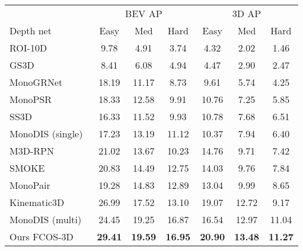 
\begin{table}[t!]
\centering
{
\footnotesize
\setlength{\tabcolsep}{0.4em}
\begin{tabular}{l|ccc|ccc}
\toprule
& \multicolumn{3}{c}{BEV AP} & \multicolumn{3}{c}{3D AP} \\ 
\multirow{-2}{*}{Depth net}& 
Easy & 
Med &
Hard &
Easy & Med & Hard \vspace{0.5mm}\\
\midrule
ROI-10D~\cite{manhardt2019roi} & 
9.78 & 
4.91 &
3.74 &
4.32 &
2.02 &
1.46
\\
GS3D~\cite{li2019gs3d} & 
8.41 & 
6.08 &
4.94 &
4.47 &
2.90 &
2.47
\\
MonoGRNet~\cite{qin2019monogrnet} & 
18.19 & 
11.17 &
8.73 &
9.61 &
5.74 &
4.25
\\
MonoPSR~\cite{ku2019monocular} & 
18.33 & 
12.58 &
9.91 &
10.76 &
7.25 &
5.85
\\

SS3D~\cite{jorgensen2019monocular} & 
16.33 & 
11.52 &
9.93 &
10.78 &
7.68 &
6.51
\\

MonoDIS (single)~\cite{simonelli2019disentangling} & 
17.23 & 
13.19 &
11.12 &
10.37 &
7.94 &
6.40
\\

M3D-RPN~\cite{brazil2019m3d} & 
21.02 & 
13.67 &
10.23 &
14.76 &
9.71 &
7.42
\\

SMOKE~\cite{liu2020smoke} & 
20.83 & 
14.49 &
12.75 &
14.03 &
9.76 &
7.84
\\

MonoPair~\cite{chen2020monopair} & 
19.28 & 
14.83 &
12.89 &
13.04 &
9.99 &
8.65
\\



Kinematic3D~\cite{brazil2020kinematic} & 
26.99 & 
17.52 &
13.10 &
19.07 &
12.72 &
9.17
\\

MonoDIS (multi)~\cite{simonelli2020disentangling} & 
24.45 & 
19.25 &
16.87 &
16.54 &
12.97 &
11.04
\\




Ours FCOS-3D & 
\textbf{29.41} & 
\textbf{19.59} &
\textbf{16.95} &
\textbf{20.90} &
\textbf{13.48} &
\textbf{11.27}
\\





\end{tabular}}
\end{table}
